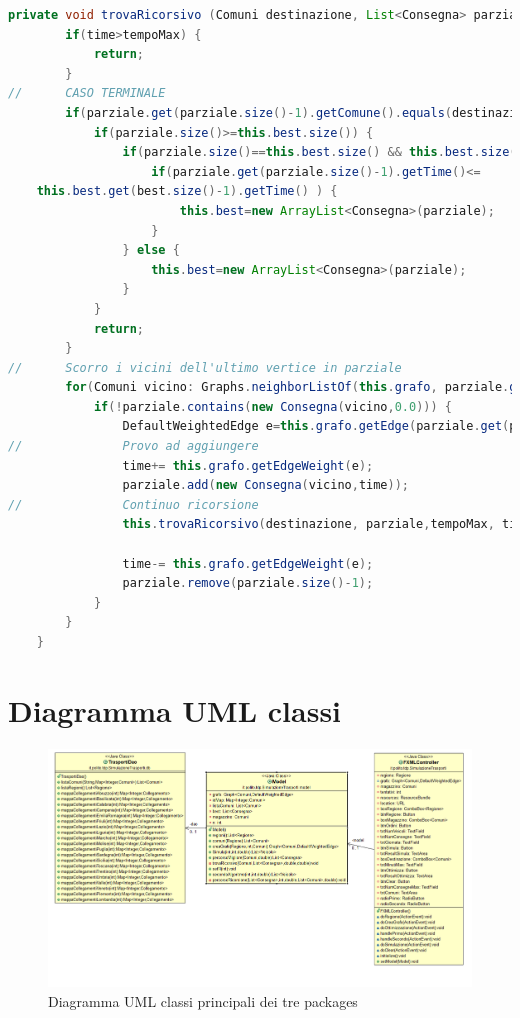 \documentclass[a4paper,12pt]{report}
\begin{document}
\begin{center}
\begin{lstlisting}[caption={Metodo trovaRicorsivo() della classe Model},  label={lst:trovaRicorsivo},captionpos=b, language=Java]
private void trovaRicorsivo (Comuni destinazione, List<Consegna> parziale, double tempoMax,double time) {
		if(time>tempoMax) {
			return;
		}
//		CASO TERMINALE
		if(parziale.get(parziale.size()-1).getComune().equals(destinazione)) {
			if(parziale.size()>=this.best.size()) {
				if(parziale.size()==this.best.size() && this.best.size()>0) {
					if(parziale.get(parziale.size()-1).getTime()<=
	this.best.get(best.size()-1).getTime() ) {
						this.best=new ArrayList<Consegna>(parziale);
					}
				} else {
					this.best=new ArrayList<Consegna>(parziale);
				}
			}
			return;
		}
//		Scorro i vicini dell'ultimo vertice in parziale
		for(Comuni vicino: Graphs.neighborListOf(this.grafo, parziale.get(parziale.size()-1).getComune() ) ) {
			if(!parziale.contains(new Consegna(vicino,0.0))) {
				DefaultWeightedEdge e=this.grafo.getEdge(parziale.get(parziale.size()-1).getComune(), vicino);
//				Provo ad aggiungere
				time+= this.grafo.getEdgeWeight(e);
				parziale.add(new Consegna(vicino,time));
//				Continuo ricorsione
				this.trovaRicorsivo(destinazione, parziale,tempoMax, time);
				
				time-= this.grafo.getEdgeWeight(e);
				parziale.remove(parziale.size()-1);
			}
		}
	}

\end{lstlisting}
\end{center}


\chapter{Diagramma UML classi}

\begin{figure}[h]
\begin{center}
\includegraphics[width=0.8\paperwidth]{Images/DiagrammaUMLPrinc.png} 
\caption{Diagramma UML classi principali dei tre packages}  
\end{center}
\end{figure}
\end{document}
